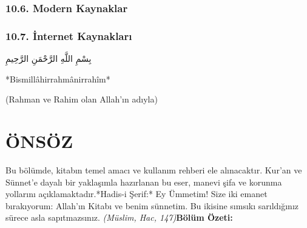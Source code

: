 \documentclass[12pt,a4paper]{article}
\begin{document}
\subsubsection{10.6. Modern Kaynaklar}
\subsubsection{10.7. İnternet Kaynakları}

\begin{arabic}
بِسْمِ اللَّهِ الرَّحْمَنِ الرَّحِيمِ
\end{arabic}

*Bismillâhirrahmânirrahîm*

(Rahman ve Rahim olan Allah'ın adıyla)

\section{ÖNSÖZ}
Bu bölümde, kitabın temel amacı ve kullanım rehberi ele alınacaktır. Kur'an ve Sünnet'e dayalı bir yaklaşımla hazırlanan bu eser, manevi şifa ve korunma yollarını açıklamaktadır.*Hadis-i Şerif:* Ey Ümmetim! Size iki emanet bırakıyorum: Allah'ın Kitabı ve benim sünnetim. Bu ikisine sımsıkı sarıldığınız sürece asla sapıtmazsınız. \textit{(Müslim, Hac, 147)}\textbf{Bölüm Özeti:}
\end{document}
